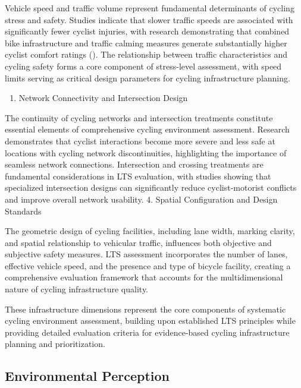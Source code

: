 \documentclass[
  12pt,
  oneside]{book}
\providecommand{\tightlist}{%
  \setlength{\itemsep}{0pt}\setlength{\parskip}{0pt}}
\begin{document}
Vehicle speed and traffic volume represent fundamental determinants of cycling stress and safety. Studies indicate that slower traffic speeds are associated with significantly fewer cyclist injuries, with research demonstrating that combined bike infrastructure and traffic calming measures generate substantially higher cyclist comfort ratings (\textcite{fitch_what_2022}). The relationship between traffic characteristics and cycling safety forms a core component of stress-level assessment, with speed limits serving as critical design parameters for cycling infrastructure planning.

\begin{enumerate}
\def\labelenumi{\arabic{enumi}.}
\setcounter{enumi}{2}
\tightlist
\item
  Network Connectivity and Intersection Design
\end{enumerate}

The continuity of cycling networks and intersection treatments constitute essential elements of comprehensive cycling environment assessment. Research demonstrates that cyclist interactions become more severe and less safe at locations with cycling network discontinuities, highlighting the importance of seamless network connections. Intersection and crossing treatments are fundamental considerations in LTS evaluation, with studies showing that specialized intersection designs can significantly reduce cyclist-motorist conflicts and improve overall network usability.
4. Spatial Configuration and Design Standards

The geometric design of cycling facilities, including lane width, marking clarity, and spatial relationship to vehicular traffic, influences both objective and subjective safety measures. LTS assessment incorporates the number of lanes, effective vehicle speed, and the presence and type of bicycle facility, creating a comprehensive evaluation framework that accounts for the multidimensional nature of cycling infrastructure quality.

These infrastructure dimensions represent the core components of systematic cycling environment assessment, building upon established LTS principles while providing detailed evaluation criteria for evidence-based cycling infrastructure planning and prioritization.

\subsection{Environmental Perception}\label{environmental-perception}
\end{document}
